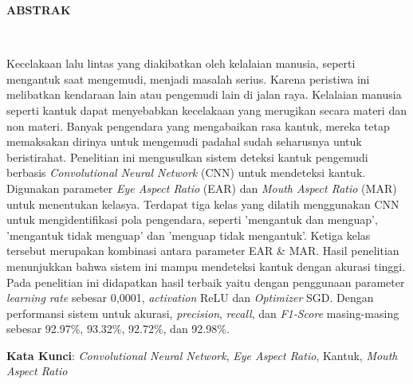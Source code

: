 \clearpage
\centering
{}
 \vspace{1em}
\normalsize \bfseries \centering \MakeUppercase{Abstrak}
% 
\\[2\baselineskip]

\justifying \normalfont \normalsize
{

Kecelakaan lalu lintas yang diakibatkan oleh kelalaian manusia, seperti mengantuk saat mengemudi, menjadi masalah serius. Karena peristiwa ini  melibatkan kendaraan lain atau pengemudi lain di jalan raya. Kelalaian manusia seperti kantuk dapat menyebabkan kecelakaan yang merugikan secara materi dan non materi. Banyak pengendara yang mengabaikan rasa kantuk, mereka tetap memaksakan dirinya untuk mengemudi padahal sudah seharusnya untuk beristirahat. Penelitian ini mengusulkan sistem deteksi kantuk pengemudi berbasis \textit{Convolutional Neural Network} (CNN) untuk mendeteksi kantuk. Digunakan parameter \textit{Eye Aspect Ratio} (EAR) dan \textit{Mouth Aspect Ratio} (MAR) untuk menentukan kelasya. Terdapat tiga kelas yang dilatih menggunakan CNN untuk mengidentifikasi pola pengendara, seperti 'mengantuk dan menguap', 'mengantuk tidak menguap' dan 'menguap tidak mengantuk'. Ketiga kelas tersebut 
merupakan kombinasi antara parameter EAR \& MAR. Hasil penelitian menunjukkan bahwa sistem ini mampu mendeteksi kantuk dengan akurasi tinggi. Pada penelitian ini didapatkan hasil terbaik yaitu dengan penggunaan parameter \textit{learning rate} sebesar 0,0001, \textit{activation} ReLU dan \textit{Optimizer} SGD. Dengan performansi sistem untuk akurasi, \textit{precision}, \textit{recall}, dan \textit{F1-Score} masing-masing sebesar 92.97\%, 93.32\%, 92.72\%, dan 92.98\%.

}

\textbf{Kata Kunci}: \textit{Convolutional Neural Network}, \textit{Eye Aspect Ratio}, Kantuk, \textit{Mouth Aspect Ratio}
\clearpage